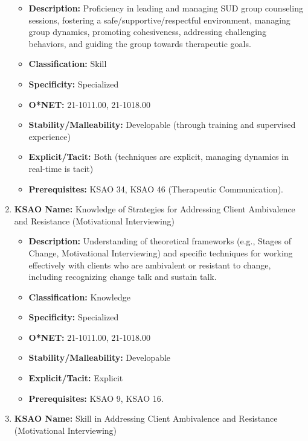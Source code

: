 \documentclass[
  letterpaper,
  DIV=11,
  numbers=noendperiod]{scrartcl}
\providecommand{\tightlist}{%
  \setlength{\itemsep}{0pt}\setlength{\parskip}{0pt}}
\begin{document}
\begin{enumerate}
  \begin{itemize}
  \tightlist
  \item
    \textbf{Description:} Proficiency in leading and managing SUD group
    counseling sessions, fostering a safe/supportive/respectful
    environment, managing group dynamics, promoting cohesiveness,
    addressing challenging behaviors, and guiding the group towards
    therapeutic goals.
  \item
    \textbf{Classification:} Skill
  \item
    \textbf{Specificity:} Specialized
  \item
    \textbf{O*NET:} 21-1011.00, 21-1018.00
  \item
    \textbf{Stability/Malleability:} Developable (through training and
    supervised experience)
  \item
    \textbf{Explicit/Tacit:} Both (techniques are explicit, managing
    dynamics in real-time is tacit)
  \item
    \textbf{Prerequisites:} KSAO 34, KSAO 46 (Therapeutic
    Communication).
  \end{itemize}
\item
  \textbf{KSAO Name:} Knowledge of Strategies for Addressing Client
  Ambivalence and Resistance (Motivational Interviewing)

  \begin{itemize}
  \tightlist
  \item
    \textbf{Description:} Understanding of theoretical frameworks (e.g.,
    Stages of Change, Motivational Interviewing) and specific techniques
    for working effectively with clients who are ambivalent or resistant
    to change, including recognizing change talk and sustain talk.
  \item
    \textbf{Classification:} Knowledge
  \item
    \textbf{Specificity:} Specialized
  \item
    \textbf{O*NET:} 21-1011.00, 21-1018.00
  \item
    \textbf{Stability/Malleability:} Developable
  \item
    \textbf{Explicit/Tacit:} Explicit
  \item
    \textbf{Prerequisites:} KSAO 9, KSAO 16.
  \end{itemize}
\item
  \textbf{KSAO Name:} Skill in Addressing Client Ambivalence and
  Resistance (Motivational Interviewing)


\end{enumerate}
\end{document}

